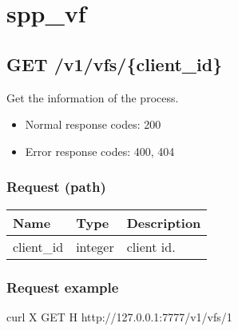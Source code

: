 \documentclass[a4paper,11pt,openany,oneside,english]{sphinxmanual}
\begin{document}
\section{spp\_vf}
\label{\detokenize{api_ref/spp_vf:spp-vf}}\label{\detokenize{api_ref/spp_vf:spp-ctl-rest-api-spp-vf}}\label{\detokenize{api_ref/spp_vf::doc}}

\subsection{GET /v1/vfs/\{client\_id\}}
\label{\detokenize{api_ref/spp_vf:get-v1-vfs-client-id}}
Get the information of the  process.
\begin{itemize}
\item {} 
Normal response codes: 200

\item {} 
Error response codes: 400, 404

\end{itemize}


\subsubsection{Request (path)}
\label{\detokenize{api_ref/spp_vf:request-path}}

\begin{savenotes}\sphinxattablestart
\centering
{}
\sphinxthecaptionisattop
{}\label{\detokenize{api_ref/spp_vf:id19}}\label{\detokenize{api_ref/spp_vf:table-spp-ctl-vfs-get}}
\sphinxaftertopcaption
\begin{tabulary}{\linewidth}[t]{|T|T|T|}
\hline
\sphinxstyletheadfamily 
Name
&\sphinxstyletheadfamily 
Type
&\sphinxstyletheadfamily 
Description
\\
\hline
client\_id
&
integer
&
client id.
\\
\hline
\end{tabulary}
\par
\sphinxattableend\end{savenotes}


\subsubsection{Request example}
\label{\detokenize{api_ref/spp_vf:request-example}}
\begin{sphinxVerbatim}[commandchars=\\\{\},formatcom=\footnotesize]
 curl \PYGZhy{}X GET \PYGZhy{}H  
  http://127.0.0.1:7777/v1/vfs/1
\end{sphinxVerbatim}
\end{document}
